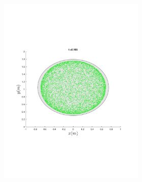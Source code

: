 \begin{figure}
{\begin{subfigure}{0.5\textwidth}
\begin{subfigure}[b]{0.5\textwidth}
        \includegraphics[trim={1cm 7cm 1cm 7cm},
        width=\textwidth]{figures/method/FunnelSimOverlaid15funnel-1}
      \end{subfigure}%
      \\
      \begin{subfigure}[b]{0.5\textwidth}

\end{subfigure}
\end{subfigure}}
\end{figure}
